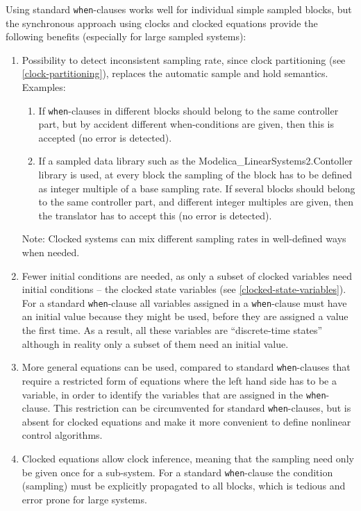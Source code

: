 \begin{nonnormative}
Using standard \lstinline!when!-clauses works well for individual simple sampled blocks, but the synchronous approach using clocks and clocked equations provide the following benefits (especially for large sampled systems):
\begin{enumerate}
\item
  Possibility to detect inconsistent sampling rate, since clock partitioning (see \cref{clock-partitioning}), replaces the automatic sample and hold semantics.
  Examples:
  \begin{enumerate}
  \def\labelenumii{\alph{enumii}.}
  \item
    If \lstinline!when!-clauses in different blocks should belong to the same
    controller part, but by accident different when-conditions are
    given, then this is accepted (no error is detected).
  \item
    If a sampled data library such as the Modelica\_LinearSystems2.Contoller library is used, at every block the sampling of the block has to be defined as integer multiple of a base sampling rate.
    If several blocks should belong to the same controller part, and different integer multiples are given, then the translator has to accept this (no error is detected).
  \end{enumerate}
  Note: Clocked systems can mix different sampling rates in well-defined ways when needed.
\item
  Fewer initial conditions are needed, as only a subset of clocked variables need initial conditions -- the clocked state variables (see \cref{clocked-state-variables}).
  For a standard \lstinline!when!-clause all variables assigned in a \lstinline!when!-clause must have an initial value because they might be used, before they are assigned a value the first time.
  As a result, all these variables are ``discrete-time states'' although in reality only a subset of them need an initial value.
\item
  More general equations can be used, compared to standard \lstinline!when!-clauses that require a restricted form of equations where the left hand side has to be a variable, in order to identify the variables that are assigned in the \lstinline!when!-clause.
  This restriction can be circumvented for standard \lstinline!when!-clauses, but is absent for clocked equations and make it more convenient to define nonlinear control algorithms.
\item
  Clocked equations allow clock inference, meaning that the sampling need only be given once for a sub-system.
  For a standard \lstinline!when!-clause the condition (sampling) must be explicitly propagated to all blocks, which is tedious and error prone for large systems.

\end{enumerate}
\end{nonnormative}
